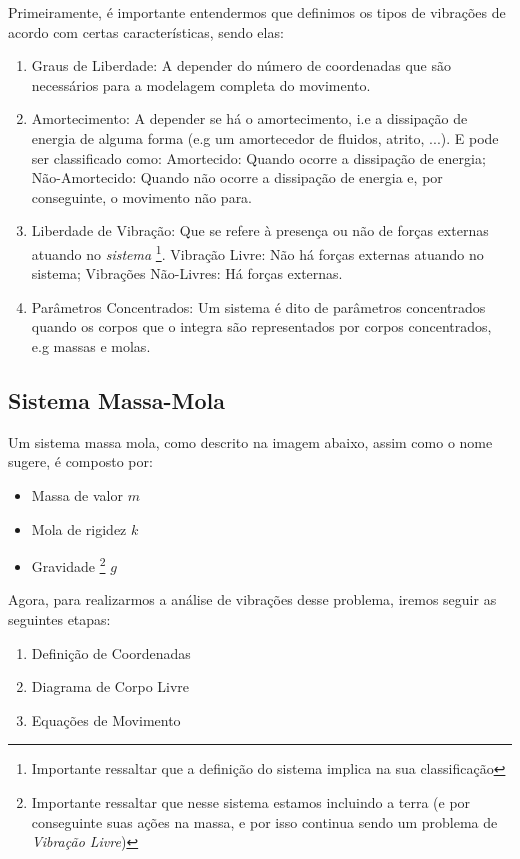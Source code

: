 \documentclass{article}
\begin{document}
Primeiramente, é importante entendermos que definimos os tipos de vibrações de acordo com certas características, sendo elas:
\begin{enumerate}
    \item Graus de Liberdade: A depender do número de coordenadas que são necessários para a modelagem completa do movimento.
    \item Amortecimento: A depender se há o amortecimento, i.e a dissipação de energia de alguma forma (e.g um amortecedor de fluidos, atrito, ...). E pode ser classificado como:
          \subitem Amortecido: Quando ocorre a dissipação de energia;
          \subitem Não-Amortecido: Quando não ocorre a dissipação de energia e, por conseguinte, o movimento não para.

    \item Liberdade de Vibração: Que se refere à presença ou não de forças externas atuando no \emph{sistema} \footnote{Importante ressaltar que a definição do sistema implica na sua classificação}.
          \subitem Vibração Livre: Não há forças externas atuando no sistema;
          \subitem Vibrações Não-Livres: Há forças externas.

    \item Parâmetros Concentrados: Um sistema é dito de parâmetros concentrados quando os corpos que o integra são representados por corpos concentrados, e.g massas e molas.
\end{enumerate}


\subsection{Sistema Massa-Mola}

Um sistema massa mola, como descrito na imagem abaixo, assim como o nome sugere, é composto por:
\begin{itemize}
    \item Massa  de valor $m$
    \item Mola de rigidez $k$
    \item Gravidade \footnote{Importante ressaltar que nesse sistema estamos incluindo a terra (e por conseguinte suas ações na massa, e por isso continua sendo um problema de
              \emph{Vibração Livre})} $g$
\end{itemize}

Agora, para realizarmos a análise de vibrações desse problema, iremos seguir as seguintes etapas:
\begin{enumerate}
    \item Definição de Coordenadas
    \item Diagrama de Corpo Livre
    \item Equações de Movimento
\end{enumerate}
\end{document}
